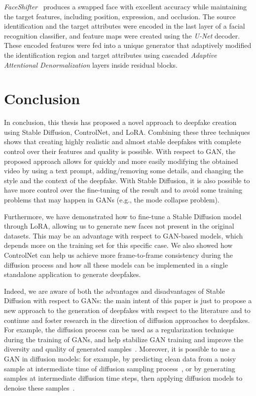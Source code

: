 \documentclass[preprint]{elsarticle}
\begin{document}
\emph{FaceShifter}~\cite{faceshifter} produces a swapped face with excellent accuracy while maintaining the target features, including position, expression, and occlusion. The source identification and the target attributes were encoded in the last layer of a facial recognition classifier, and feature maps were created using the \emph{U-Net} decoder. These encoded features were fed into a unique generator that adaptively modified the identification region and target attributes using cascaded \emph{Adaptive Attentional Denormalization} layers inside residual blocks.



\section{Conclusion}\label{sect:conclusion}
In conclusion, this thesis has proposed a novel approach to deepfake creation using Stable Diffusion, ControlNet, and LoRA. Combining these three techniques shows that creating highly realistic and almost stable deepfakes with complete control over their features and quality is possible. With respect to GAN, the proposed approach allows for quickly and more easily modifying the obtained video by  using a text prompt, adding/removing some details, and changing the style  and the context of the deepfake. With Stable Diffusion, it is also possible to have more control over the fine-tuning of the result and to avoid some training problems that may happen in GANs (e.g., the mode collapse problem).

Furthermore, we have demonstrated how to fine-tune a Stable Diffusion model through LoRA,  allowing us to generate new faces not present in the original datasets. This may be an advantage with respect to GAN-based models, which depends more on the training set for this specific case. We also showed how ControlNet can help us achieve more frame-to-frame consistency during the diffusion process and how all these models can be implemented in a single standalone application to generate deepfakes. 

Indeed, we are aware of both the advantages and disadvantages of Stable Diffusion with respect to GANs: the main intent of this paper is just to propose a new approach to the generation of deepfakes with respect to the literature and to continue and foster research in the direction of diffusion approaches to deepfakes. For example, the diffusion process can be used as a regularization technique during the training of GANs, and help stabilize GAN training and improve the diversity and quality of generated samples~\cite{mix}.
Moreover, it is possible to use a GAN  in diffusion models: for example, by predicting clean data from a noisy sample at intermediate time of diffusion sampling process~\cite{ganindiff1}, or by generating samples at intermediate diffusion time steps, then applying diffusion models to denoise these samples~\cite{ganindiff2}.
\end{document}

